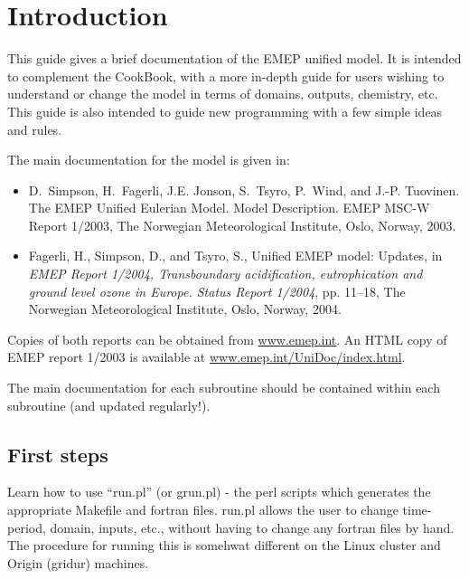 \chapter{Introduction}

This guide gives a brief documentation of the EMEP unified model.
It is intended to complement the CookBook, with a more
in-depth guide for users 
wishing to understand or change 
the model in terms of domains, outputs, chemistry, etc.
This guide is also intended to guide new programming with a few
simple ideas and rules.

The main documentation for the model is given in:

\begin{itemize}
\item
D.~Simpson, H.~Fagerli, J.E. Jonson, S.~Tsyro, P.~Wind, and J.-P. Tuovinen.
{The EMEP Unified Eulerian Model. Model Description}.
EMEP MSC-W Report 1/2003, The Norwegian
Meteorological Institute, Oslo, Norway, 2003.
\item
Fagerli, H., Simpson, D., and Tsyro, S., {Unified EMEP model: Updates}, in {\em
  EMEP Report 1/2004, Transboundary acidification, eutrophication and ground
  level ozone in Europe. Status Report 1/2004\/}, pp. 11--18, The Norwegian
  Meteorological Institute, Oslo, Norway, 2004.
\end{itemize}

Copies of both reports can be obtained from \url{www.emep.int}. An HTML
copy of EMEP report 1/2003 is available at \url{www.emep.int/UniDoc/index.html}.




The main documentation for each subroutine should be contained within
each subroutine (and updated regularly!).

\section{First steps}

Learn how to use ``run.pl'' (or grun.pl) - the perl scripts which generates
the appropriate Makefile and fortran files. run.pl allows
the user to change time-period, domain, inputs, etc., without
having to change any fortran files by hand. The procedure for running
this is somehwat different on the Linux cluster and  Origin (gridur)
machines.

